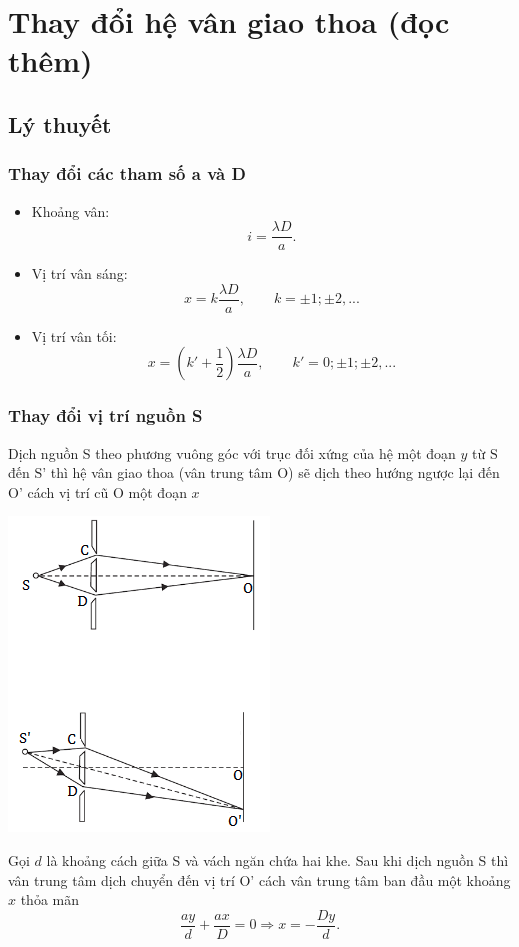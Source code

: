
\chapter[Thay đổi hệ vân giao thoa (đọc thêm)]{Thay đổi hệ vân giao thoa (đọc thêm)}

\section{Lý thuyết}

\subsection{Thay đổi các tham số a và D}

\begin{itemize}
	\item Khoảng vân:
	\begin{equation}
		i=\dfrac{\lambda D}{a}.
	\end{equation}
	\item Vị trí vân sáng:
	\begin{equation}
		x=k\dfrac{\lambda D}{a},\qquad k=\pm 1; \pm 2,...
	\end{equation}
	\item Vị trí vân tối: 
	\begin{equation}
		x=\left(k'+\dfrac{1}{2}\right) \dfrac{\lambda D}{a},\qquad k'=0; \pm 1; \pm 2,... 
	\end{equation}
\end{itemize}

\subsection{Thay đổi vị trí nguồn S}

Dịch nguồn S theo phương vuông góc với trục đối xứng của hệ một đoạn $y$ từ $\text{S}$ đến $\text{S'}$  thì hệ vân giao thoa (vân trung tâm O) sẽ dịch theo hướng ngược lại đến O' cách vị trí cũ O một đoạn $x$
\begin{center}
	\includegraphics[scale=0.8]{../figs/giaothoa-dichnguon-hung.png}
\end{center}
Gọi $d$ là khoảng cách giữa S và vách ngăn chứa hai khe. Sau khi dịch nguồn S thì vân trung tâm dịch chuyển đến vị trí O' cách vân trung tâm ban đầu một khoảng $x$ thỏa mãn
\begin{equation}
	\dfrac{ay}{d}+\dfrac{ax}{D}=0 \Rightarrow x=-\dfrac{Dy}{d}.
\end{equation} 

